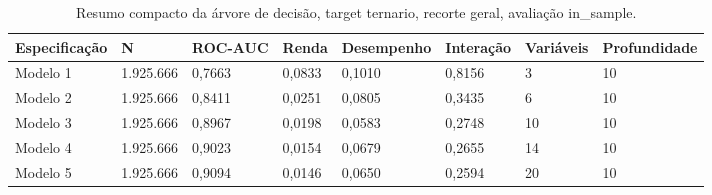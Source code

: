 \begin{table}
\caption{Resumo compacto da árvore de decisão, target ternario, recorte geral, avaliação in_sample.}
\label{tab:tabela_compacta_treeClassification_10_profundidade_ternario_recorte_geral_in_sample}
\begin{tabular}{llllllll}
\toprule
Especificação & N & ROC-AUC & Renda & Desempenho & Interação & Variáveis & Profundidade \\
\midrule
Modelo 1 & 1.925.666 & 0,7663 & 0,0833 & 0,1010 & 0,8156 & 3 & 10 \\
Modelo 2 & 1.925.666 & 0,8411 & 0,0251 & 0,0805 & 0,3435 & 6 & 10 \\
Modelo 3 & 1.925.666 & 0,8967 & 0,0198 & 0,0583 & 0,2748 & 10 & 10 \\
Modelo 4 & 1.925.666 & 0,9023 & 0,0154 & 0,0679 & 0,2655 & 14 & 10 \\
Modelo 5 & 1.925.666 & 0,9094 & 0,0146 & 0,0650 & 0,2594 & 20 & 10 \\
\bottomrule
\end{tabular}
\end{table}
